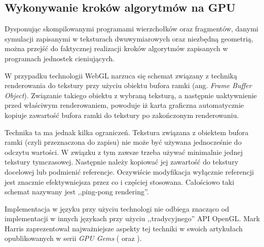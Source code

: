 \subsection{Wykonywanie kroków algorytmów na GPU}
\label{sec:wykonNaGPU}

Dysponując skompilowanymi programami wierzchołków oraz fragmentów, danymi
symulacji zapisanymi w teksturach dwuwymiarowych oraz niezbędną geometrią,
można przejść do faktycznej realizacji kroków algorytmów
zapisanych w programach jednostek cieniujących.

W przypadku technologii WebGL narzuca się schemat związany z techniką
renderowania do tekstury przy użyciu obiektu bufora ramki (ang. \emph{Frame
Buffer Object}). Związanie takiego obiektu z wybraną teksturą, a następnie
uaktywnienie przed właściwym renderowaniem, powoduje iż karta graficzna
automatycznie kopiuje zawartość bufora ramki do tekstury po zakończonym
renderowaniu.

Technika ta ma jednak kilka ograniczeń. Tekstura związana z obiektem bufora
ramki (czyli przeznaczona do zapisu) nie może być używana jednocześnie do
odczytu wartości. W związku z tym zawsze trzeba używać minimalnie jednej
tekstury tymczasowej. Następnie należy kopiować jej zawartość do tekstury
docelowej lub podmienić referencje. Oczywiście modyfikacja wyłącznie
referencji  jest znacznie efektywniejsza przez co i częściej stosowana.
Całościowo taki schemat nazywany jest ,,ping-pong rendering''.

Implementacja w języku  przy użyciu technologi  nie
odbiega znacząco od implementacji w innych językach przy użyciu
,,tradycyjnego'' API OpenGL. Mark Harris zaprezentował najważniejsze aspekty
tej techniki w swoich artykułach opublikowanych w serii \emph{GPU Gems}
(\cite{GPUConcepts} oraz \cite{GPUFluid}).
